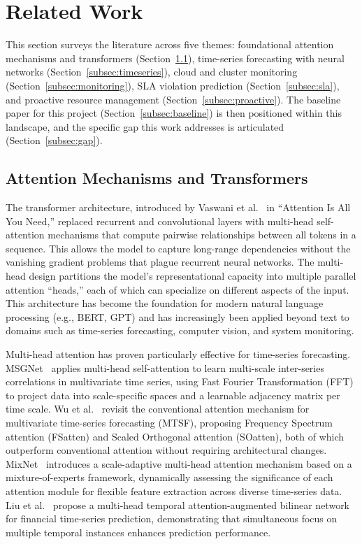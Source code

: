 \section{Related Work}
\label{sec:rw}

This section surveys the literature across five themes: foundational attention mechanisms and transformers (Section~\ref{subsec:attention}), time-series forecasting with neural networks (Section~\ref{subsec:timeseries}), cloud and cluster monitoring (Section~\ref{subsec:monitoring}), SLA violation prediction (Section~\ref{subsec:sla}), and proactive resource management (Section~\ref{subsec:proactive}). The baseline paper for this project (Section~\ref{subsec:baseline}) is then positioned within this landscape, and the specific gap this work addresses is articulated (Section~\ref{subsec:gap}).

\subsection{Attention Mechanisms and Transformers}
\label{subsec:attention}

The transformer architecture, introduced by Vaswani et al.~\cite{Vaswani17} in ``Attention Is All You Need,'' replaced recurrent and convolutional layers with multi-head self-attention mechanisms that compute pairwise relationships between all tokens in a sequence. This allows the model to capture long-range dependencies without the vanishing gradient problems that plague recurrent neural networks. The multi-head design partitions the model's representational capacity into multiple parallel attention ``heads,'' each of which can specialize on different aspects of the input. This architecture has become the foundation for modern natural language processing (e.g., BERT, GPT) and has increasingly been applied beyond text to domains such as time-series forecasting, computer vision, and system monitoring.

Multi-head attention has proven particularly effective for time-series forecasting. MSGNet~\cite{MSGNet24} applies multi-head self-attention to learn multi-scale inter-series correlations in multivariate time series, using Fast Fourier Transformation (FFT) to project data into scale-specific spaces and a learnable adjacency matrix per time scale. Wu et al.~\cite{Wu25} revisit the conventional attention mechanism for multivariate time-series forecasting (MTSF), proposing Frequency Spectrum attention (FSatten) and Scaled Orthogonal attention (SOatten), both of which outperform conventional attention without requiring architectural changes. MixNet~\cite{MixNet26} introduces a scale-adaptive multi-head attention mechanism based on a mixture-of-experts framework, dynamically assessing the significance of each attention module for flexible feature extraction across diverse time-series data. Liu et al.~\cite{BilinearAttention22} propose a multi-head temporal attention-augmented bilinear network for financial time-series prediction, demonstrating that simultaneous focus on multiple temporal instances enhances prediction performance.

